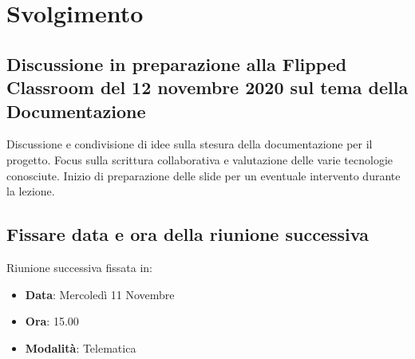 \documentclass[]{article}
\begin{document}
\newpage

\section{Svolgimento}
\subsection{Discussione in preparazione alla Flipped Classroom del 12 novembre 2020 sul tema della Documentazione}
Discussione e condivisione di idee sulla stesura della documentazione per il progetto. Focus sulla scrittura collaborativa e valutazione delle varie tecnologie conosciute.
Inizio di preparazione delle slide per un eventuale intervento durante la lezione.\\

\subsection{Fissare data e ora della riunione successiva}
Riunione successiva fissata in:
\begin{itemize}
	\item \textbf{Data}: Mercoledì 11 Novembre
	\item \textbf{Ora}: 15.00
	\item \textbf{Modalità}: Telematica
\end{itemize}


	
\end{document}
